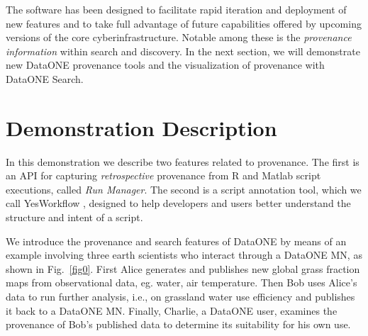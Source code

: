 \documentclass[a4paper]{llncs}
\newcommand{\authornote}[2] {
    \begin{center}
        \framebox{
            {\begin{minipage}[t]{0.9\linewidth}
                \color{red}
                \raggedright  \textbf{[#1]}~ \scriptsize #2 \normalsize
            \end{minipage}}
    }
    \end{center}
}
\begin{document}

The software has been designed to facilitate rapid iteration and deployment of new features and to take full advantage of future capabilities offered by upcoming versions of the core cyberinfrastructure. Notable among these is the \emph{provenance information} within search and discovery. In the next section, we will demonstrate new DataONE provenance tools and the visualization of provenance with DataONE Search.


\section{Demonstration Description}  \label{demo}

In this demonstration we describe two features related to provenance. 
The first is an API for capturing \textit{retrospective} provenance from R \cite{recordr} and Matlab \cite{matlabdataone} script executions, called \emph{Run Manager}.
The second is a script annotation tool, which we call YesWorkflow \cite{yesworkflow}, designed to help developers and users better understand the structure and intent of a script.



We introduce the provenance and search features of DataONE by means of an example involving three earth scientists who interact through a DataONE MN, as shown in Fig.~\ref{fig0}. First Alice generates and publishes new global grass fraction maps from observational data, eg. water, air temperature. Then Bob uses Alice's data to run further analysis, i.e., on grassland water use efficiency and publishes it back to a DataONE MN. Finally, Charlie, a DataONE user, examines the provenance of Bob's published data to determine its suitability for his own use.
\end{document}
